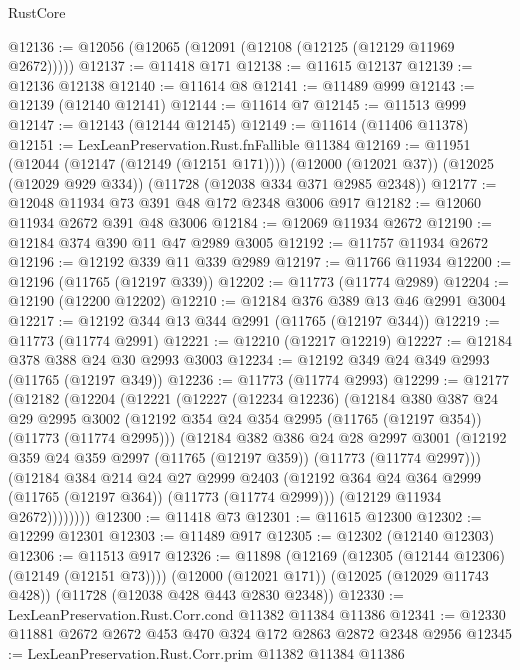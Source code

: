 \begin{lexlean}{RustCore}
\begin{coremodule}
@12136 := @12056 (@12065 (@12091 (@12108 (@12125 (@12129 @11969 @2672)))))
@12137 := @11418 @171
@12138 := @11615 @12137
@12139 := @12136 @12138
@12140 := @11614 @8
@12141 := @11489 @999
@12143 := @12139 (@12140 @12141)
@12144 := @11614 @7
@12145 := @11513 @999
@12147 := @12143 (@12144 @12145)
@12149 := @11614 (@11406 @11378)
@12151 := LexLeanPreservation.Rust.fnFallible @11384
@12169 := @11951
    (@12044 (@12147 (@12149 (@12151 @171))))
    (@12000 (@12021 @37))
    (@12025 (@12029 @929 @334))
    (@11728 (@12038 @334 @371 @2985 @2348))
@12177 := @12048 @11934 @73 @391 @48 @172 @2348 @3006 @917
@12182 := @12060 @11934 @2672 @391 @48 @3006
@12184 := @12069 @11934 @2672
@12190 := @12184 @374 @390 @11 @47 @2989 @3005
@12192 := @11757 @11934 @2672
@12196 := @12192 @339 @11 @339 @2989
@12197 := @11766 @11934
@12200 := @12196 (@11765 (@12197 @339))
@12202 := @11773 (@11774 @2989)
@12204 := @12190 (@12200 @12202)
@12210 := @12184 @376 @389 @13 @46 @2991 @3004
@12217 := @12192 @344 @13 @344 @2991 (@11765 (@12197 @344))
@12219 := @11773 (@11774 @2991)
@12221 := @12210 (@12217 @12219)
@12227 := @12184 @378 @388 @24 @30 @2993 @3003
@12234 := @12192 @349 @24 @349 @2993 (@11765 (@12197 @349))
@12236 := @11773 (@11774 @2993)
@12299 := @12177
    (@12182
      (@12204
        (@12221
          (@12227
            (@12234 @12236)
            (@12184
              @380
              @387
              @24
              @29
              @2995
              @3002
              (@12192 @354 @24 @354 @2995 (@11765 (@12197 @354)) (@11773 (@11774 @2995)))
              (@12184
                @382
                @386
                @24
                @28
                @2997
                @3001
                (@12192 @359 @24 @359 @2997 (@11765 (@12197 @359)) (@11773 (@11774 @2997)))
                (@12184
                  @384
                  @214
                  @24
                  @27
                  @2999
                  @2403
                  (@12192 @364 @24 @364 @2999 (@11765 (@12197 @364)) (@11773 (@11774 @2999)))
                  (@12129 @11934 @2672))))))))
@12300 := @11418 @73
@12301 := @11615 @12300
@12302 := @12299 @12301
@12303 := @11489 @917
@12305 := @12302 (@12140 @12303)
@12306 := @11513 @917
@12326 := @11898
    (@12169 (@12305 (@12144 @12306) (@12149 (@12151 @73))))
    (@12000 (@12021 @171))
    (@12025 (@12029 @11743 @428))
    (@11728 (@12038 @428 @443 @2830 @2348))
@12330 := LexLeanPreservation.Rust.Corr.cond @11382 @11384 @11386
@12341 := @12330 @11881 @2672 @2672 @453 @470 @324 @172 @2863 @2872 @2348 @2956
@12345 := LexLeanPreservation.Rust.Corr.prim @11382 @11384 @11386

\end{coremodule}
\end{lexlean}
